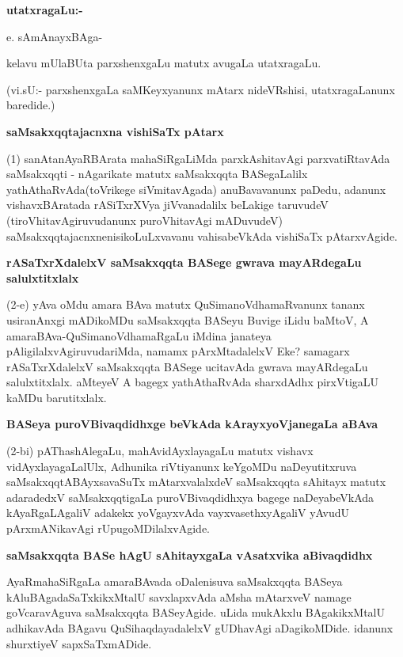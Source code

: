 {\bigskip
\noindent
{\large\bf utatxragaLu:-}}
\medskip

\noindent
e. sAmAnayxBAga-

kelavu mUlaBUta parxshenxgaLu matutx avugaLa utatxragaLu.

(vi.sU:- parxshenxgaLa saMKeyxyanunx mAtarx nideVRshisi, utatxragaLanunx baredide.)

{\bigskip
\noindent
{\large\bf saMsakxqqtajacnxna vishiSaTx pAtarx}}\label{page30}
\medskip

\noindent
(1) sanAtanAyaRBArata mahaSiRgaLiMda parxkAshitavAgi parxvatiRtavAda saMsakxqqti - nAgarikate matutx \-saMsakxqqta BASegaLalilx yathAthaRvAda(toVrikege siVmita\-vAgada) anuBavavanunx paDedu, adanunx vishavx\-BAratada rASiTxrXVya jiVvanadalilx beLakige taruvudeV (tiroVhitavAgiruvudanunx puroVhitavAgi mADu\-vudeV) saMsakxqqtajacnxnenisikoLuLxvavanu vahisabeVkAda vishiSaTx pAtarxvAgide.

{\bigskip
\noindent
{\large\bf rASaTxrXdalelxV saMsakxqqta BASege gwrava mayARdegaLu salulxtitxlalx}}\label{page30}
\medskip

\noindent
(2-e) yAva oMdu amara BAva matutx QuSimanoVdhamaRvanunx tananx usira\-nAnxgi mADi\-koMDu saMsakxqqta BASeyu Buvige iLidu baMtoV, A amaraBAva-\-QuSimanoVdhamaRgaLu iMdina jana\-teya pAligilalxvAgiruvudariMda, namamx pArxMtadalelxV Eke? samagarx rASaTxrXdalelxV saMsakxqqta BASege ucita\-vAda gwrava mayARdegaLu salulxtitxlalx. aMteyeV A bagegx yathAthaRvAda sharxdAdhx pirxVtigaLU kaMDu barutitxlalx.

{\bigskip
\noindent
{\large\bf BASeya puroVBivaqdidhxge beVkAda kArayxyoVjanegaLa aBAva}}\label{page31}
\medskip

\noindent
(2-bi) pAThashAlegaLu, mahAvidAyxlayagaLu matutx vishavx vidAyxlayagaLalUlx, Adhunika riVtiyanunx keY\-goMDu naDeyutitxruva saMsakxqqtABAyxsavaSuTx mAtarxvalalxdeV saMsakxqqta sAhitayx matutx adaradedxV saMsakxqqti\-gaLa puroVBivaqdidhxya bagege naDeya\-beVkAda kAyaRgaLAgaliV adakekx yoVgayxvAda vayxvasethx\-yAgaliV yAvudU pArxmANikavAgi rUpugoMDilalxvAgide.

{\bigskip
\noindent
{\large\bf saMsakxqqta BASe hAgU sAhitayxgaLa vAsatxvika aBivaqdidhx}}\label{page31}
\medskip

\noindent
AyaRmahaSiRgaLa amaraBAvada oDalenisuva saMsakxqqta BASeya kAluBAga\-daSaTx\-kikxMtalU savxlapx\-vAda aMsha mAtarxveV namage goVcaravAguva saMsakxqqta BASeyAgide. uLida mukAkxlu BAgakikxMtalU adhika\-vAda BAgavu QuSihaqdayadalelxV gUDha\-vAgi aDagikoMDide. idanunx shurxtiyeV sapxSaTxmADide.

